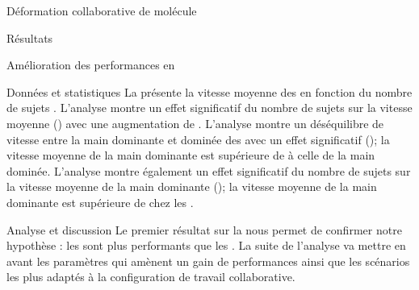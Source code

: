 \documentclass[myfrancais,ngerman,english,french]{mythesis}
\begin{document}
\begin{mychapter}{Déformation collaborative de molécule}
\begin{mysection}{Résultats}
\begin{mysubsection}{Amélioration des performances en }
\begin{mysubsubsection}{Données et statistiques}
					La  présente la vitesse moyenne des   en fonction du nombre de sujets .
					L'analyse montre un effet significatif du nombre de sujets  sur la vitesse moyenne  () avec une augmentation de .
					L'analyse montre un déséquilibre de vitesse entre la main dominante et dominée des  avec un effet significatif (); la vitesse moyenne de la main dominante est supérieure de  à celle de la main dominée.
					L'analyse montre également un effet significatif du nombre de sujets  sur la vitesse moyenne  de la main dominante (); la vitesse moyenne de la main dominante est supérieure de  chez les .
				\end{mysubsubsection}
				\begin{mysubsubsection}{Analyse et discussion}
					Le premier résultat sur la  nous permet de confirmer notre hypothèse  : les  sont plus performants que les .
					La suite de l'analyse va mettre en avant les paramètres qui amènent un gain de performances ainsi que les scénarios les plus adaptés à la configuration de travail collaborative.


\end{mysubsubsection}
\end{mysubsection}
\end{mysection}
\end{mychapter}
\end{document}
